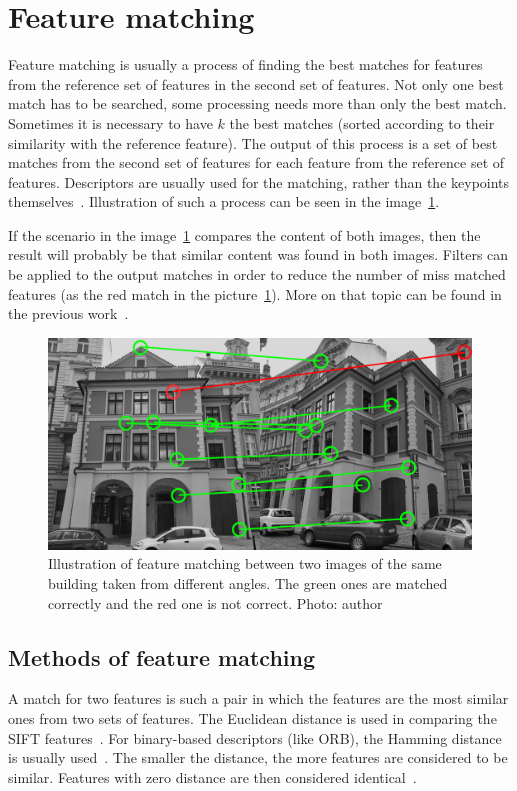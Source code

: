 \documentclass[thesis=B,english]{FITthesis}[2019/12/23]
\begin{document}
    \section{Feature matching}
        Feature matching is usually a process of finding the best matches for features from the reference set of features in the second set of features. Not only one best match has to be searched, some processing needs more than only the best match. Sometimes it is necessary to have \(k\) the best matches (sorted according to their similarity with the reference feature). The output of this process is a set of best matches from the second set of features for each feature from the reference set of features. Descriptors are usually used for the matching, rather than the keypoints themselves~\cite{Szeliski2010-ab}. Illustration of such a process can be seen in the image~\ref{fig:featuresMatching}.
        
        If the scenario in the image~\ref{fig:featuresMatching} compares the content of both images, then the result will probably be that similar content was found in both images. Filters can be applied to  the output matches in order to reduce the number of miss matched features (as the red match in the picture~\ref{fig:featuresMatching}). More on that topic can be found in the previous work~\cite{Sefcik2020}.
        
        \begin{figure}
            \centering
            \includegraphics[width = 0.8\linewidth]{pictures/featuresMatching.jpg}
            \caption[Illustration of feature matching]{Illustration of feature matching between two images of the same building taken from different angles. The green ones are matched correctly and the red one is not correct. Photo: author}
            \label{fig:featuresMatching}
        \end{figure}

        \subsection{Methods of feature matching}
            A match for two features is such a pair in which the features are the most similar ones from two sets of features. The Euclidean distance is used in comparing the SIFT features~\cite{1315206}. For binary-based descriptors (like ORB), the Hamming distance is usually used~\cite{Mordvintsevc2013}. The smaller the distance, the more features are considered to be similar. Features with zero distance are then considered identical~\cite{1315206}.
                
\end{document}
